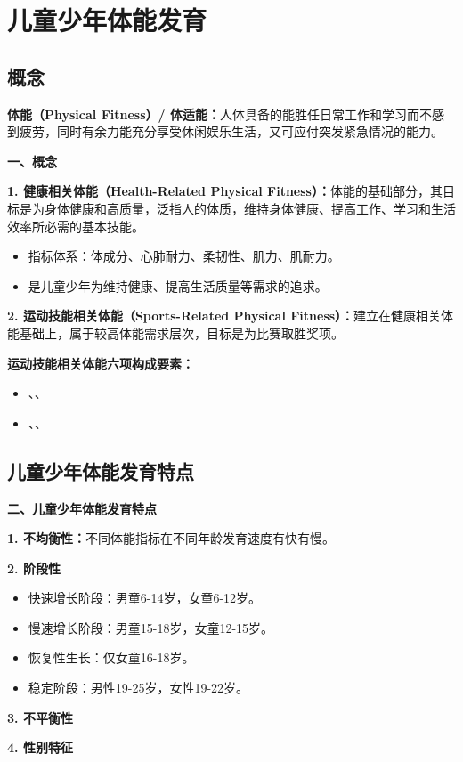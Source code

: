 \section{儿童少年体能发育}

\subsection{概念}

\begin{keybox}
\textbf{体能（Physical Fitness）/ 体适能：}人体具备的能胜任日常工作和学习而不感到疲劳，同时有余力能充分享受休闲娱乐生活，又可应付突发紧急情况的能力。

\textbf{一、概念}

\textbf{1. 健康相关体能（Health-Related Physical Fitness）：}体能的基础部分，其目标是为身体健康和高质量，泛指人的体质，维持身体健康、提高工作、学习和生活效率所必需的基本技能。
\begin{itemize}[leftmargin=*]
    \item 指标体系：体成分、心肺耐力、柔韧性、肌力、肌耐力。
    \item 是儿童少年为维持健康、提高生活质量等需求的追求。
\end{itemize}

\textbf{2. 运动技能相关体能（Sports-Related Physical Fitness）：}建立在健康相关体能基础上，属于较高体能需求层次，目标是为比赛取胜奖项。

\textbf{运动技能相关体能六项构成要素：}
\begin{itemize}[leftmargin=*]
    \item {}、、
    \item {}、、
\end{itemize}
\end{keybox}

\subsection{儿童少年体能发育特点}

\begin{keybox}
\textbf{二、儿童少年体能发育特点}

\textbf{1. 不均衡性：}不同体能指标在不同年龄发育速度有快有慢。

\textbf{2. 阶段性}
\begin{itemize}[leftmargin=*]
    \item 快速增长阶段：男童6-14岁，女童6-12岁。
    \item 慢速增长阶段：男童15-18岁，女童12-15岁。
    \item 恢复性生长：仅女童16-18岁。
    \item 稳定阶段：男性19-25岁，女性19-22岁。
\end{itemize}

\textbf{3. 不平衡性}

\textbf{4. 性别特征}
\end{keybox}

